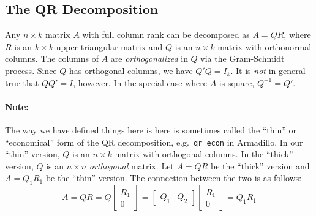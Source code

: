 \documentclass[12pt]{article}
\theoremstyle{definition}
\begin{document}
\subsection{The QR Decomposition}
Any $n\times k$ matrix $A$ with full column rank can be decomposed as $A = QR$, where $R$ is an $k\times k$ upper triangular matrix and $Q$ is an $n\times k$ matrix with orthonormal columns. The columns of $A$ are \emph{orthogonalized} in $Q$ via the Gram-Schmidt process. Since $Q$ has orthogonal columns, we have $Q'Q = I_k$. It is \emph{not} in general true that $QQ' = I$, however. In the special case where $A$ is square, $Q^{-1} = Q'$.

\paragraph{Note:} The way we have defined things here is here is sometimes called the ``thin'' or ``economical'' form of the QR decomposition, e.g.\ \texttt{qr\_econ} in Armadillo. In our ``thin'' version, $Q$ is an $n\times k$ matrix with orthogonal columns. In the ``thick'' version, $Q$ is an $n\times n$ \emph{orthogonal} matrix. Let $A = QR$ be the ``thick'' version and $A = Q_1 R_1$ be the ``thin'' version. The connection between the two is as follows:
  $$A = QR = Q \left[\begin{array}
    {c} R_1 \\ 0 
  \end{array} \right] = \left[  \begin{array}
    {cc} Q_1 & Q_2
  \end{array}\right]\left[\begin{array}
    {c} R_1 \\ 0 
  \end{array} \right] = Q_1 R_1$$
\end{document}

